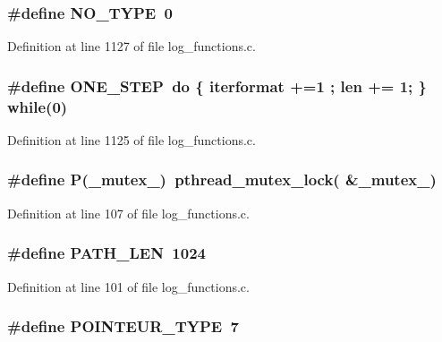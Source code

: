 \subsubsection[{NO\_\-TYPE}]{\setlength{\rightskip}{0pt plus 5cm}\#define NO\_\-TYPE~0}\label{log__functions_8c_4159b53da9c6fe869517755161b5b3bc}




Definition at line 1127 of file log\_\-functions.c.
\subsubsection[{ONE\_\-STEP}]{\setlength{\rightskip}{0pt plus 5cm}\#define ONE\_\-STEP~do \{ iterformat +=1 ; len += 1; \} while(0)}\label{log__functions_8c_4869604911231c5078f2f1bb950190b0}




Definition at line 1125 of file log\_\-functions.c.
\subsubsection[{P}]{\setlength{\rightskip}{0pt plus 5cm}\#define P(\_\-mutex\_\-)~pthread\_\-mutex\_\-lock( \&\_\-mutex\_\-)}\label{log__functions_8c_13190861330e48fe885da6b2671876a9}




Definition at line 107 of file log\_\-functions.c.
\subsubsection[{PATH\_\-LEN}]{\setlength{\rightskip}{0pt plus 5cm}\#define PATH\_\-LEN~1024}\label{log__functions_8c_943afdb7a415a72b444ecbc5c9286fae}




Definition at line 101 of file log\_\-functions.c.
\subsubsection[{POINTEUR\_\-TYPE}]{\setlength{\rightskip}{0pt plus 5cm}\#define POINTEUR\_\-TYPE~7}\label{log__functions_8c_2319cd78a001d66f293813c037507116}




